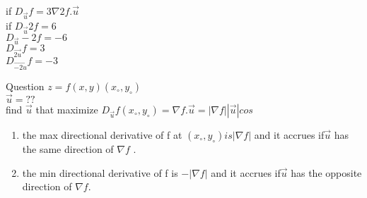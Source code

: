 \noindent{\color{smalt(darkpowderblue)}\rule{\linewidth}{.2mm}}
\begin{example}
if $D_{\overrightarrow{u}} f = 3    \nabla 2f .{\overrightarrow{u}}$\\
if $D_{\overrightarrow{u}} 2f = 6$\\
$D_{\overrightarrow{u}} -2f = -6$\\
$D_{\overrightarrow{2u}} f = 3$\\
$D_{\overrightarrow{-2u}} f = -3 $
\end{example}
\noindent{\color{smalt(darkpowderblue)}\rule{\linewidth}{.2mm}}
Question $z = f(x,y)(x_\circ , y_\circ)$\\
${\overrightarrow{u}} = ??$\\
find ${\overrightarrow{u}}$ that maximize $D_{\overrightarrow{u}} f(x_\circ , y_\circ )= \nabla f .{\overrightarrow{u}} = |\nabla f| |{\overrightarrow{u}}| cos$\\


\begin{theorem}
 \begin{enumerate}
    \item the max directional derivative of f at $(x_\circ , y_\circ) is |\nabla f|$ and it accrues if${\overrightarrow{u}}$ has the same direction of $\nabla f$ .
    \item the min directional derivative of f is $-|\nabla f | $ and it accrues if${\overrightarrow{u}}$ has the opposite direction of $\nabla f$.
\end{enumerate}
\end{theorem}

